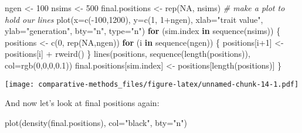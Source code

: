 \documentclass[
]{article}
\newenvironment{Shaded}{\begin{snugshade}}{\end{snugshade}}
\newcommand{\AttributeTok}[1]{\textcolor[rgb]{0.77,0.63,0.00}{#1}}
\newcommand{\CommentTok}[1]{\textcolor[rgb]{0.56,0.35,0.01}{\textit{#1}}}
\newcommand{\ConstantTok}[1]{\textcolor[rgb]{0.00,0.00,0.00}{#1}}
\newcommand{\ControlFlowTok}[1]{\textcolor[rgb]{0.13,0.29,0.53}{\textbf{#1}}}
\newcommand{\DecValTok}[1]{\textcolor[rgb]{0.00,0.00,0.81}{#1}}
\newcommand{\FloatTok}[1]{\textcolor[rgb]{0.00,0.00,0.81}{#1}}
\newcommand{\FunctionTok}[1]{\textcolor[rgb]{0.00,0.00,0.00}{#1}}
\newcommand{\NormalTok}[1]{#1}
\newcommand{\OtherTok}[1]{\textcolor[rgb]{0.56,0.35,0.01}{#1}}
\newcommand{\SpecialCharTok}[1]{\textcolor[rgb]{0.00,0.00,0.00}{#1}}
\newcommand{\StringTok}[1]{\textcolor[rgb]{0.31,0.60,0.02}{#1}}
\begin{document}
\begin{Shaded}
\begin{Highlighting}[]
\NormalTok{ngen }\OtherTok{\textless{}{-}} \DecValTok{100}
\NormalTok{nsims }\OtherTok{\textless{}{-}} \DecValTok{500}
\NormalTok{final.positions }\OtherTok{\textless{}{-}} \FunctionTok{rep}\NormalTok{(}\ConstantTok{NA}\NormalTok{, nsims)}
\CommentTok{\# make a plot to hold our lines}
\FunctionTok{plot}\NormalTok{(}\AttributeTok{x=}\FunctionTok{c}\NormalTok{(}\SpecialCharTok{{-}}\DecValTok{100}\NormalTok{,}\DecValTok{1200}\NormalTok{), }\AttributeTok{y=}\FunctionTok{c}\NormalTok{(}\DecValTok{1}\NormalTok{, }\DecValTok{1}\SpecialCharTok{+}\NormalTok{ngen), }\AttributeTok{xlab=}\StringTok{"trait value"}\NormalTok{, }\AttributeTok{ylab=}\StringTok{"generation"}\NormalTok{, }\AttributeTok{bty=}\StringTok{"n"}\NormalTok{, }\AttributeTok{type=}\StringTok{"n"}\NormalTok{)}
\ControlFlowTok{for}\NormalTok{ (sim.index }\ControlFlowTok{in} \FunctionTok{sequence}\NormalTok{(nsims)) \{}
\NormalTok{  positions }\OtherTok{\textless{}{-}} \FunctionTok{c}\NormalTok{(}\DecValTok{0}\NormalTok{, }\FunctionTok{rep}\NormalTok{(}\ConstantTok{NA}\NormalTok{,ngen))}
  \ControlFlowTok{for}\NormalTok{ (i }\ControlFlowTok{in} \FunctionTok{sequence}\NormalTok{(ngen)) \{}
\NormalTok{    positions[i}\SpecialCharTok{+}\DecValTok{1}\NormalTok{] }\OtherTok{\textless{}{-}}\NormalTok{ positions[i] }\SpecialCharTok{+} \FunctionTok{rweird}\NormalTok{()}
\NormalTok{  \}}
  \FunctionTok{lines}\NormalTok{(positions, }\FunctionTok{sequence}\NormalTok{(}\FunctionTok{length}\NormalTok{(positions)), }\AttributeTok{col=}\FunctionTok{rgb}\NormalTok{(}\DecValTok{0}\NormalTok{,}\DecValTok{0}\NormalTok{,}\DecValTok{0}\NormalTok{,}\FloatTok{0.1}\NormalTok{))}
\NormalTok{  final.positions[sim.index] }\OtherTok{\textless{}{-}}\NormalTok{ positions[}\FunctionTok{length}\NormalTok{(positions)]}
\NormalTok{\}}
\end{Highlighting}
\end{Shaded}

\texttt{[image: comparative-methods\_files/figure-latex/unnamed-chunk-14-1.pdf]}

And now let's look at final positions again:

\begin{Shaded}
\begin{Highlighting}[]
\FunctionTok{plot}\NormalTok{(}\FunctionTok{density}\NormalTok{(final.positions), }\AttributeTok{col=}\StringTok{"black"}\NormalTok{, }\AttributeTok{bty=}\StringTok{"n"}\NormalTok{)}
\end{Highlighting}
\end{Shaded}
\end{document}
